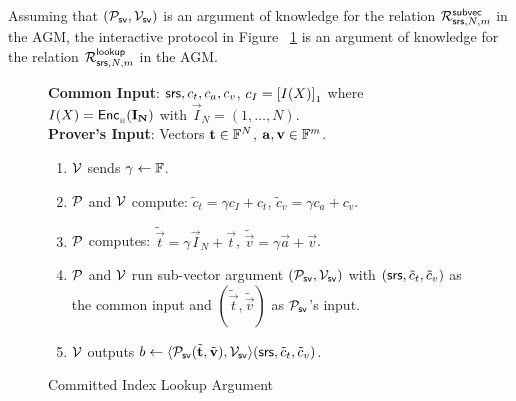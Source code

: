 \begin{lemma}\label{lem:proto-committed-index-lookup}
Assuming that $(\mathcal{P}_{\mathsf{sv}},\mathcal{V}_{\mathsf{sv}})$ is an argument of knowledge for the relation $\mathcal{R}^{\mathsf{subvec}}_{\mathsf{srs},N,m}$ in the AGM, the interactive protocol
in Figure ~\ref{fig:committed-index-lookup} is an argument of knowledge for the relation $\mathcal{R}^{\mathsf{lookup}}_{\mathsf{srs},N,m}$ in the AGM.
\end{lemma}

\begin{figure}[htbp]
\begin{mdframed}
{
    {\bf Common Input}: $\mathsf{srs},c_t, c_a, c_v$, $c_I=\left[{I(X)}\right]_1$ where $I(X)=\mathsf{Enc}_{{}_{\mathbb{H}}}(\mathbf{\mathbf{I}_N})$
    with $\vec{I}_N=(1,\ldots,N)$. \\
    {\bf Prover's Input}: Vectors $\mathbf{t}\in \mathbb{F}^N$, $\mathbf{a},\mathbf{v}\in\mathbb{F}^m$.
    \begin{enumerate}[leftmargin=1em, label=\arabic*.]
    \item $\mathcal{V}$ sends $\gamma\gets \mathbb{F}$.
    \item $\mathcal{P}$ and $\mathcal{V}$ compute: $\tilde{c}_t=\gamma c_I+c_t$, $\tilde{c}_v=\gamma c_a + c_v$.
    \item $\mathcal{P}$ computes: $\tilde{\vec{t}}=\gamma\vec{I}_N + \vec{t}$, $\tilde{\vec{v}}=\gamma\vec{a} + \vec{v}$.
    \item $\mathcal{P}$ and $\mathcal{V}$ run sub-vector argument $(\mathcal{P}_{\mathsf{sv}},\mathcal{V}_{\mathsf{sv}})$ with
    $(\mathsf{srs},\tilde{c}_t,\tilde{c}_v)$ as the common input and $(\tilde{\vec{t}},\tilde{\vec{v}})$ as $\mathcal{P}_{\mathsf{sv}}$'s input.
    \item $\mathcal{V}$ outputs
    $b\gets \langle {\ensuremath{\mathcal{P}}_{\mathsf{sv}}}({\tilde{\mathbf{t}},\tilde{\mathbf{v}}}), {\mathcal{V}_{\mathsf{sv}}}\rangle({\mathsf{srs},\tilde{c}_t,\tilde{c}_v})$.
    \end{enumerate}
}
\end{mdframed}
\caption{Committed Index Lookup Argument}
\label{fig:committed-index-lookup}
\end{figure}

